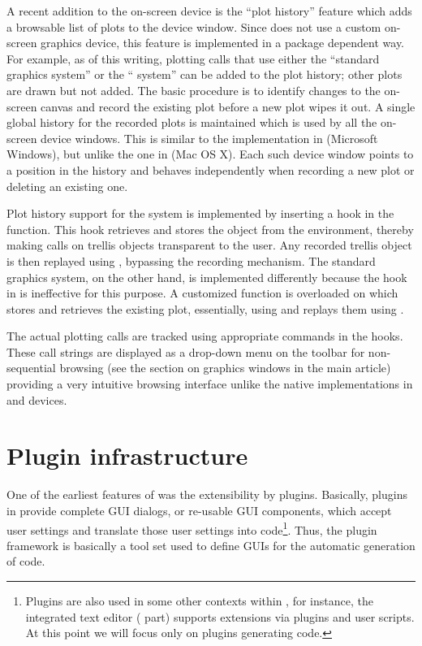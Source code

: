 \documentclass[article,shortnames]{jss}
\begin{document}
A recent addition to the on-screen device is the ``plot history'' feature which
adds a browsable list of plots to the device window. Since  does not use a
custom on-screen graphics device, this feature is implemented in a package
dependent way. For example, as of this writing, plotting calls that use either
the ``standard graphics system'' or the `` system'' can be added to the plot
history; other plots are drawn but not added. The basic procedure is to identify
changes to the on-screen canvas and record the existing plot before a new plot
wipes it out. A single global history for the recorded plots is maintained
which is used by all the on-screen device windows. This is similar to the
implementation in  (Microsoft Windows), but unlike the one in  
(Mac OS X). Each such device window points to a position in the history
and behaves independently when recording a new plot or deleting an existing
one.

Plot history support for the
 system \citep{Sarkar2008} is implemented by inserting a hook in the 
function. This hook retrieves and stores the  object from the
 environment, thereby making  calls on trellis
objects transparent to the user. Any recorded trellis object is then replayed
using , bypassing the recording mechanism. The standard graphics
system, on the other hand, is implemented differently because the hook in
 is ineffective for this purpose. A customized function is overloaded
on  which stores and retrieves the existing plot, essentially, using
 and replays them using .

The actual plotting calls are tracked using appropriate  commands in
the hooks. These call strings are displayed as a drop-down menu on the toolbar
for non-sequential browsing (see the section on graphics windows in the main article) providing a very intuitive browsing
interface unlike the native implementations in  and  devices.

\pagebreak
\section{Plugin infrastructure}
\label{sec:technical_plugins}
One of the earliest features of  was the extensibility by plugins.
Basically, plugins in  provide complete GUI dialogs, or re-usable
GUI components, which accept user settings and translate those user settings
into  code\footnote{
    Plugins are also used in some other contexts within , for instance, the
    integrated text editor ( part) supports extensions via plugins and user scripts. At this point we
    will focus only on plugins generating  code.
}. Thus, the plugin framework is basically a tool set used to define
GUIs for the automatic generation of  code.
\end{document}
